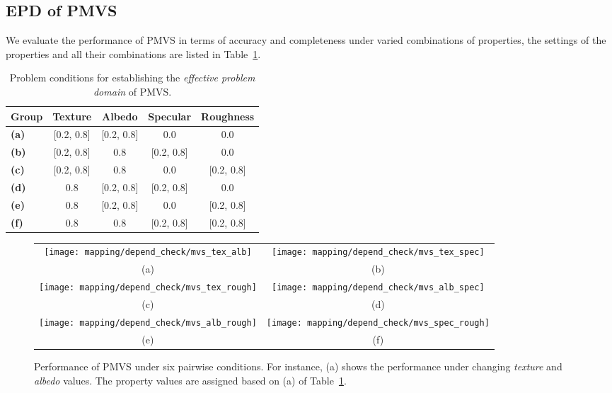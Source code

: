 \subsection{EPD of PMVS}
We evaluate the performance of PMVS in terms of accuracy and completeness under varied combinations of properties, the settings of the properties and all their combinations are listed in Table~\ref{tab:mvs_depend_check_params}.
\begin{table}[!htbp]
  \centering
  \begin{tabular}{l*{4}{c}}
  \hline
  \textbf{Group} & Texture & Albedo & Specular & Roughness\\
  \hline
  \textbf{(a)} & [0.2, 0.8] & [0.2, 0.8] & 0.0 & 0.0\\
  \textbf{(b)} & [0.2, 0.8] & 0.8 & [0.2, 0.8] & 0.0\\
  \textbf{(c)} & [0.2, 0.8] & 0.8 & 0.0 & [0.2, 0.8]\\
  \textbf{(d)} & 0.8 & [0.2, 0.8] & [0.2, 0.8] & 0.0\\
  \textbf{(e)} & 0.8 & [0.2, 0.8] & 0.0 & [0.2, 0.8]\\
  \textbf{(f)} & 0.8 & 0.8 & [0.2, 0.8] & [0.2, 0.8]\\
  \hline
  \end{tabular}
  \caption{Problem conditions for establishing the \textit{effective problem domain} of PMVS.}
  \label{tab:mvs_depend_check_params}
\end{table}

\begin{figure}[!htbp]
\begin{tabular}{cc}
\texttt{[image: mapping/depend\_check/mvs\_tex\_alb]}&
\texttt{[image: mapping/depend\_check/mvs\_tex\_spec]}\\
(a) & (b)\\
\texttt{[image: mapping/depend\_check/mvs\_tex\_rough]}&
\texttt{[image: mapping/depend\_check/mvs\_alb\_spec]}\\
(c) & (d)\\
\texttt{[image: mapping/depend\_check/mvs\_alb\_rough]}&
\texttt{[image: mapping/depend\_check/mvs\_spec\_rough]}\\
(e) & (f)\\
\end{tabular}
\caption{Performance of PMVS under six pairwise conditions. For instance, (a) shows the performance under changing \textit{texture} and \textit{albedo} values. The property values are assigned based on (a) of Table~\ref{tab:mvs_depend_check_params}.}
\label{fig:mvs_depend_check}
\end{figure}

